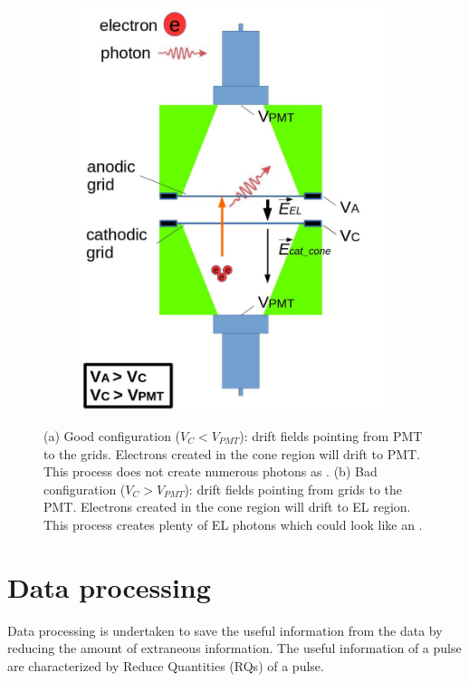 \begin{figure}[!p]
\begin{subfigure}[b]{\halfwidth}
   \includegraphics[width=\figurewidth,clip,trim={0 0 0 0}]{Figures/GasTest/WeiDrawEvent/BadConfig.jpg}
   \caption{}
   \label{fig:BelowCathodeIllustration:BadConfig}
 \end{subfigure}
 \caption[\gtest\ good and bad voltage configurations.]{(a) Good configuration ($V_{C} < V_{PMT}$): drift fields pointing from PMT to the grids. Electrons created in the cone region will drift to PMT. This process does not create numerous photons as \ees . (b) Bad configuration  ($V_{C} > V_{PMT}$): drift fields pointing from grids to the PMT. Electrons created in the cone region will drift to EL region. This process creates plenty of EL photons which could look like an \ees .}
 \label{fig:BelowCathodeIllustration}
\end{figure}

\section{Data processing} %
\label{sec:gtest data process}
Data processing is undertaken to save the useful information from the data by reducing the amount of extraneous information. %
The useful information of a pulse are characterized by Reduce Quantities (RQs) of a pulse.

